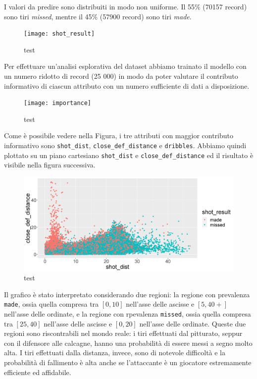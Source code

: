 \par
I valori da predire sono distribuiti in modo non uniforme. Il 55\% (70157 record) sono tiri \textit{missed}, mentre il 45\% (57900 record) sono tiri \textit{made}.

\begin{figure}
\caption{test}
	\texttt{[image: shot\_result]}
\end{figure}

\par
Per effettuare un'analisi esplorativa del dataset abbiamo trainato il modello con un numero ridotto di record (25 000) in modo da poter valutare il contributo informativo di ciascun attributo con un numero sufficiente di dati a disposizione.

\begin{figure}
\caption{test}
\fontsize{9pt}{1em}
	\texttt{[image: importance]}
\end{figure}

\par
Come è possibile vedere nella Figura, i tre attributi con maggior contributo informativo sono \texttt{shot\_dist}, \texttt{close\_def\_distance} e \texttt{dribbles}. Abbiamo quindi plottato su un piano cartesiano \texttt{shot\_dist} e \texttt{close\_def\_distance} ed il risultato è visibile nella figura successiva.

\begin{figure}
\caption{test}
\fontsize{9pt}{1em}
	\includegraphics[width=\linewidth]{plot_shot_dist_def.png}
\end{figure}

Il grafico è stato interpretato considerando due regioni: la regione con prevalenza \texttt{made}, ossia quella compresa tra $[0, 10]$ nell'asse delle ascisse e $[5, 40+] $ nell'asse delle ordinate, e la regione con rpevalenza \texttt{missed}, ossia quella compresa tra $[25, 40]$ nell'asse delle ascisse e $[0, 20] $ nell'asse delle ordinate.
Queste due regioni sono riscontrabili nel mondo reale: i tiri effettuati dal pitturato, seppur con il difensore alle calcagne, hanno una probabilità di essere messi a segno molto alta. I tiri effettuati dalla distanza, invece, sono di notevole difficoltà e la probabilità di fallimento è alta anche se l'attaccante è un giocatore estremamente efficiente ed affidabile.

